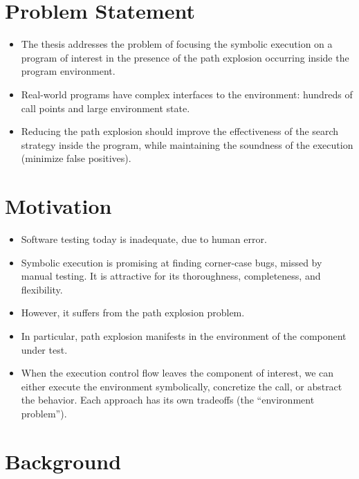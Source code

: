 \section{Problem Statement}

\begin{itemize}
\item The thesis addresses the problem of focusing the symbolic execution on a program of interest in the presence of the path explosion occurring inside the program environment.
\item Real-world programs have complex interfaces to the environment: hundreds of call points and large environment state.
\item Reducing the path explosion should improve the effectiveness of the search strategy inside the program, while maintaining the soundness of the execution (minimize false positives).
\end{itemize}


\section{Motivation}

\begin{itemize}
\item Software testing today is inadequate, due to human error.
\item Symbolic execution is promising at finding corner-case bugs, missed by manual testing.  It is attractive for its thoroughness, completeness, and flexibility.
\item However, it suffers from the path explosion problem.
\item In particular, path explosion manifests in the environment of the component under test.
\item When the execution control flow leaves the component of interest, we can either execute the environment symbolically, concretize the call, or abstract the behavior.  Each approach has its own tradeoffs (the ``environment problem'').
\end{itemize}


\section{Background}

